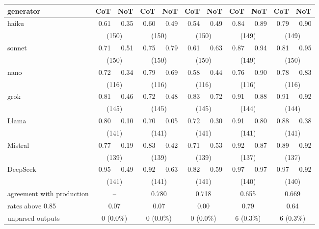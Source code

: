 \begin{table}[t]
{\begin{tabular}{@{}l@{\hspace{10pt}}r@{\hspace{6pt}}r@{\hspace{14pt}}r@{\hspace{6pt}}r@{\hspace{14pt}}r@{\hspace{6pt}}r@{\hspace{14pt}}r@{\hspace{6pt}}r@{\hspace{14pt}}r@{\hspace{6pt}}r@{}}
\cmidrule(lr){2-3}\cmidrule(lr){4-5}\cmidrule(lr){6-7}\cmidrule(lr){8-9}\cmidrule(lr){10-11}
generator & CoT & NoT & CoT & NoT & CoT & NoT & CoT & NoT & CoT & NoT \\
\midrule
haiku & 0.61 & 0.35 & 0.60 & 0.49 & 0.54 & 0.49 & 0.84 & 0.89 & 0.79 & 0.90 \\
 & \multicolumn{2}{c}{(150)} & \multicolumn{2}{c}{(150)} & \multicolumn{2}{c}{(150)} & \multicolumn{2}{c}{(149)} & \multicolumn{2}{c}{(149)} \\[1pt]
sonnet & 0.71 & 0.51 & 0.75 & 0.79 & 0.61 & 0.63 & 0.87 & 0.94 & 0.81 & 0.95 \\
 & \multicolumn{2}{c}{(150)} & \multicolumn{2}{c}{(150)} & \multicolumn{2}{c}{(150)} & \multicolumn{2}{c}{(149)} & \multicolumn{2}{c}{(150)} \\[1pt]
nano & 0.72 & 0.34 & 0.79 & 0.69 & 0.58 & 0.44 & 0.76 & 0.90 & 0.78 & 0.83 \\
 & \multicolumn{2}{c}{(116)} & \multicolumn{2}{c}{(116)} & \multicolumn{2}{c}{(116)} & \multicolumn{2}{c}{(116)} & \multicolumn{2}{c}{(116)} \\[1pt]
grok & 0.81 & 0.46 & 0.72 & 0.48 & 0.83 & 0.72 & 0.91 & 0.88 & 0.91 & 0.92 \\
 & \multicolumn{2}{c}{(145)} & \multicolumn{2}{c}{(145)} & \multicolumn{2}{c}{(145)} & \multicolumn{2}{c}{(144)} & \multicolumn{2}{c}{(144)} \\[1pt]
Llama & 0.80 & 0.10 & 0.70 & 0.05 & 0.72 & 0.30 & 0.91 & 0.80 & 0.88 & 0.38 \\
 & \multicolumn{2}{c}{(141)} & \multicolumn{2}{c}{(141)} & \multicolumn{2}{c}{(141)} & \multicolumn{2}{c}{(141)} & \multicolumn{2}{c}{(141)} \\[1pt]
Mistral & 0.77 & 0.19 & 0.83 & 0.42 & 0.71 & 0.53 & 0.92 & 0.87 & 0.89 & 0.92 \\
 & \multicolumn{2}{c}{(139)} & \multicolumn{2}{c}{(139)} & \multicolumn{2}{c}{(139)} & \multicolumn{2}{c}{(137)} & \multicolumn{2}{c}{(137)} \\[1pt]
DeepSeek & 0.95 & 0.49 & 0.92 & 0.63 & 0.82 & 0.59 & 0.97 & 0.97 & 0.97 & 0.92 \\
 & \multicolumn{2}{c}{(141)} & \multicolumn{2}{c}{(141)} & \multicolumn{2}{c}{(141)} & \multicolumn{2}{c}{(140)} & \multicolumn{2}{c}{(140)} \\[1pt]
\midrule
agreement with production & \multicolumn{2}{c}{--} & \multicolumn{2}{c}{0.780} & \multicolumn{2}{c}{0.718} & \multicolumn{2}{c}{0.655} & \multicolumn{2}{c}{0.669} \\
rates above 0.85 & \multicolumn{2}{c}{0.07} & \multicolumn{2}{c}{0.07} & \multicolumn{2}{c}{0.00} & \multicolumn{2}{c}{0.79} & \multicolumn{2}{c}{0.64} \\
unparsed outputs & \multicolumn{2}{c}{0 (0.0\%)} & \multicolumn{2}{c}{0 (0.0\%)} & \multicolumn{2}{c}{0 (0.0\%)} & \multicolumn{2}{c}{6 (0.3\%)} & \multicolumn{2}{c}{6 (0.3\%)} \\
\bottomrule
\end{tabular}}
\end{table}

